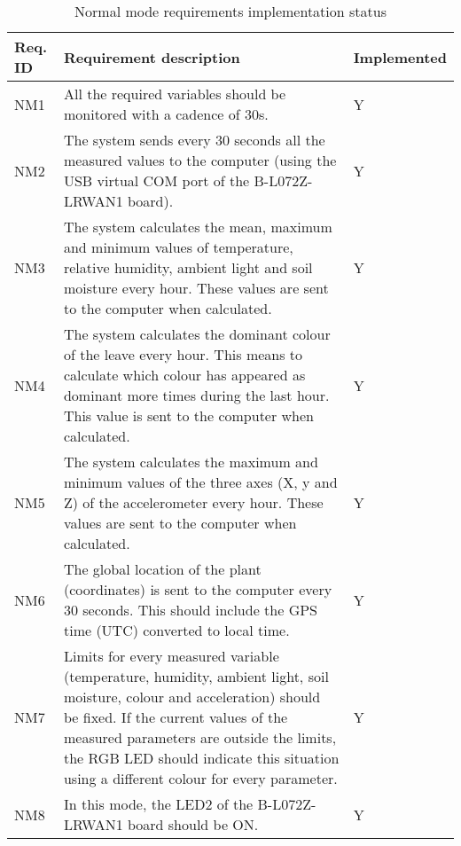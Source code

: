 \begin{table}[H]
    \begin{center}
        \begin{tabular}{p{} | p{} | p{}}
            Req. ID & Requirement description & Implemented\\
            \hline
            NM1 & All the required variables should be monitored with a cadence of 30s. & Y\\
            \hline
            NM2 & The system sends every 30 seconds all the measured values to the computer (using the USB virtual COM port of the B-L072Z-LRWAN1 board). & Y\\
            \hline
            NM3 & The system calculates the mean, maximum and minimum values of temperature, relative humidity, ambient light and soil moisture every hour. These values are sent to the computer when calculated. & Y\\
            \hline
            NM4 & The system calculates the dominant colour of the leave every hour. This means to calculate which colour has appeared as dominant more times during the last hour. This value is sent to the computer when calculated. & Y\\
            \hline
            NM5 & The system calculates the maximum and minimum values of the three axes (X, y and Z) of the accelerometer every hour. These values are sent to the computer when calculated. & Y\\
            \hline
            NM6 & The global location of the plant (coordinates) is sent to the computer every 30 seconds. This should include the GPS time (UTC) converted to local time. & Y\\
            \hline
            NM7 & Limits for every measured variable (temperature, humidity, ambient light, soil moisture, colour and acceleration) should be fixed. If the current values of the measured parameters are outside the limits, the RGB LED should indicate this situation using a different colour for every parameter. & Y\\
            \hline
            NM8 & In this mode, the LED2 of the B-L072Z-LRWAN1 board should be ON. & Y\\
            \hline
        \end{tabular} 
    \end{center}
    \caption{Normal mode requirements implementation status}
    \label{ReqNormal}
\end{table}
